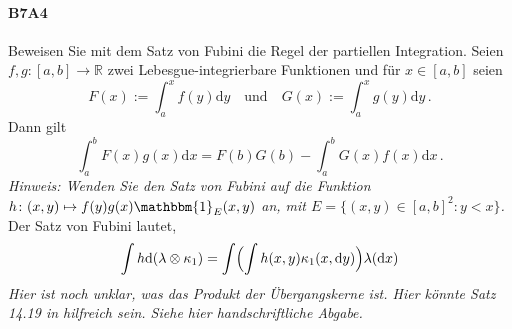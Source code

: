 \documentclass{article}
\begin{document}
\paragraph{B7A4}
Beweisen Sie mit dem Satz von Fubini die Regel der partiellen Integration.
Seien $f,g\colon [a,b]\to\mathbb{R}$ zwei Lebesgue-integrierbare Funktionen und für $x\in[a,b]$ seien
\[
  F(x):=\int_a^xf(y)\mathrm{d}y\quad\text{und}\quad G(x):=\int_a^xg(y)\mathrm{d}y\,.
\]
Dann gilt
\[
  \int_a^bF(x)g(x)\mathrm{d}x=F(b)G(b)-\int_a^bG(x)f(x)\mathrm{d}x\,.
\]
\emph{Hinweis: Wenden Sie den Satz von Fubini auf die Funktion $h\colon (x,y)\mapsto f(y)g(x)\mathbbm{1}_E(x,y)$ an, mit $E=\{(x,y)\in[a,b]^2:y<x\}$.}
Der Satz von Fubini lautet, 
\[
  \int h\mathrm{d}(\lambda\otimes\kappa_1)=\int\Bigl(\int h(x,y)\kappa_1(x,\mathrm{d}y)\Bigr)\lambda(\mathrm{d}x)
\]
\emph{Hier ist noch unklar, was das Produkt der Übergangskerne ist. Hier könnte Satz 14.19 in \cite{Klenke} hilfreich sein. Siehe hier handschriftliche Abgabe.}
\newpage



\end{document}
